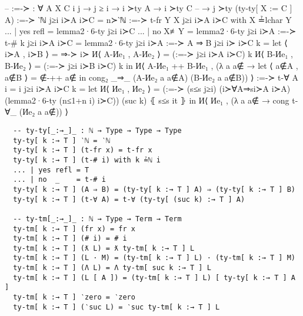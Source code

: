 \documentclass[logo,bsc,singlespacing,parskip,online]{infthesis}
\begin{document}
\begin{code}
  -- :=-≻ : ∀ {A X C i j} → j ≥ i → i ≻ty A → i ≻ty C
  --   → j ≻ty (ty-ty[ X := C ] A)
  :=-≻ {‵ℕ} j≥i i≻A i≻C = n≻‵ℕ
  :=-≻ {t-fr Y} {X} j≥i i≻A i≻C with X ≟lchar Y
  ... | yes refl = lemma2·6-ty j≥i i≻C
  ... | no  X≢Y  = lemma2·6-ty j≥i i≻A
  :=-≻ {t-# k} j≥i i≻A i≻C = lemma2·6-ty j≥i i≻A
  :=-≻ {A ⇒ B} j≥i i≻ i≻C k =
    let ⟨ i≻A , i≻B ⟩ = ⇒-≻ i≻
        И⟨ A-Иe₁ , A-Иe₂ ⟩ = (:=-≻ j≥i i≻A i≻C) k
        И⟨ B-Иe₁ , B-Иe₂ ⟩ = (:=-≻ j≥i i≻B i≻C) k
    in И⟨ A-Иe₁ ++ B-Иe₁ , (λ a {a∉} →
      let ⟨ a∉A , a∉B ⟩ = ∉-++ a∉
      in cong₂ _⇒_ (A-Иe₂ a {a∉A}) (B-Иe₂ a {a∉B})) ⟩
  :=-≻ {t-∀ A} {i = i}  j≥i i≻A i≻C k =
    let И⟨ Иe₁ , Иe₂ ⟩ = (:=-≻ (s≤s j≥i) (i≻∀A⇒si≻A i≻A) (lemma2·6-ty (n≤1+n i) i≻C)) (suc k) ⦃ s≤s it ⦄
    in И⟨ Иe₁ , (λ a {a∉} → cong t-∀_ (Иe₂ a {a∉})) ⟩
\end{code}

\begin{verbatim}
  -- ty-ty[_:→_]_ : ℕ → Type → Type → Type
  ty-ty[ k :→ T ] ‵ℕ = ‵ℕ
  ty-ty[ k :→ T ] (t-fr x) = t-fr x
  ty-ty[ k :→ T ] (t-# i) with k ≟ℕ i
  ... | yes refl = T
  ... | no  _    = t-# i
  ty-ty[ k :→ T ] (A ⇒ B) = (ty-ty[ k :→ T ] A) ⇒ (ty-ty[ k :→ T ] B)
  ty-ty[ k :→ T ] (t-∀ A) = t-∀ (ty-ty[ (suc k) :→ T ] A)

  -- ty-tm[_:→_]_ : ℕ → Type → Term → Term
  ty-tm[ k :→ T ] (fr x) = fr x
  ty-tm[ k :→ T ] (# i) = # i
  ty-tm[ k :→ T ] (ƛ L) = ƛ ty-tm[ k :→ T ] L
  ty-tm[ k :→ T ] (L · M) = (ty-tm[ k :→ T ] L) · (ty-tm[ k :→ T ] M)
  ty-tm[ k :→ T ] (Λ L) = Λ ty-tm[ suc k :→ T ] L
  ty-tm[ k :→ T ] (L [ A ]) = (ty-tm[ k :→ T ] L) [ ty-ty[ k :→ T ] A ]
  ty-tm[ k :→ T ] ‵zero = ‵zero
  ty-tm[ k :→ T ] (‵suc L) = ‵suc ty-tm[ k :→ T ] L
\end{verbatim}
\end{document}
